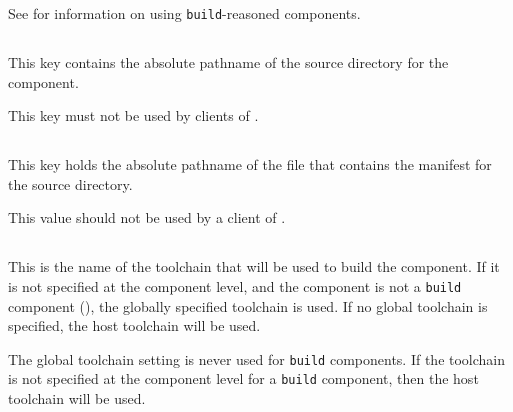   See  for information on using
  \texttt{build}-reasoned components.


\subsection{}\label{variables:source-directory}

This key contains the absolute pathname of the source directory for
the component.

This key must not be used by clients of \lmsbw.


\subsection{}\label{variables:source-mtree-manifest}

This key holds the absolute pathname of the file that contains the
\mtree manifest for the source directory.

This value should not be used by a client of \lmsbw.


\subsection{}\label{variables:toolchain}

This is the name of the toolchain that will be used to build the
component.  If it is not specified at the component level, and the
component is not a \texttt{build} component (),
the globally specified toolchain is used.  If no global toolchain is
specified, the host toolchain will be used.

The global toolchain setting is never used for \texttt{build}
components.  If the toolchain is not specified at the component level
for a \texttt{build} component, then the host toolchain will be used.

